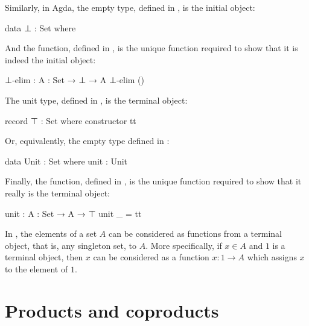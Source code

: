 \begin{example}

  \label{ex:initial-terminal-objects-agda}

  Similarly, in Agda, the empty type, defined in ,
  is the initial object:
  \begin{codeagda}
data ⊥ : Set where
  \end{codeagda}
  And the  function, defined in
  , is the unique function required to show
  that it is indeed the initial object:
  \begin{codeagda}
⊥-elim : {A : Set} → ⊥ → A
⊥-elim ()
  \end{codeagda}
  The unit type, defined in , is the terminal
  object:
  \begin{codeagda}
record ⊤ : Set where
  constructor tt
  \end{codeagda}
  Or, equivalently, the empty type defined in :
  \begin{codeagda}
data Unit : Set where
  unit : Unit
  \end{codeagda}
  Finally, the  function, defined in
  , is the unique function required to show
  that it really is the terminal object:
  \begin{codeagda}
unit : {A : Set} → A → ⊤
unit _ = tt
  \end{codeagda}

\end{example}

\begin{example}


  \label{ex:terminal-objects-constants}

  In \set, the elements of a set $A$ can be considered as functions
  from a terminal object, that is, any singleton set, to $A$. More
  specifically, if $x \in A$ and $1$ is a terminal object, then $x$
  can be considered as a function $x: 1 \to A$ which assigns $x$ to
  the element of $1$.

\end{example}

\section{Products and coproducts}
\label{sec:constructions-products-coproducts}


